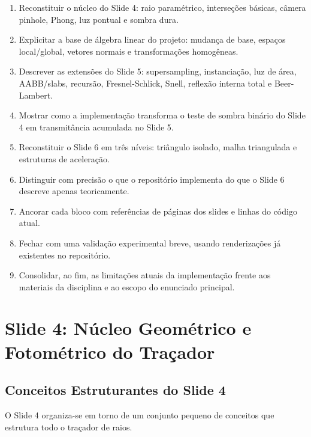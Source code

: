\documentclass[portuguese]{sbcreviews-2025}%
\begin{document}
\begin{enumerate}
    \item Reconstituir o núcleo do Slide 4: raio paramétrico, interseções básicas, câmera pinhole, Phong, luz pontual e sombra dura.
    \item Explicitar a base de álgebra linear do projeto: mudança de base, espaços local/global, vetores normais e transformações homogêneas.
    \item Descrever as extensões do Slide 5: supersampling, instanciação, luz de área, AABB/slabs, recursão, Fresnel-Schlick, Snell, reflexão interna total e Beer-Lambert.
    \item Mostrar como a implementação transforma o teste de sombra binário do Slide 4 em transmitância acumulada no Slide 5.
    \item Reconstituir o Slide 6 em três níveis: triângulo isolado, malha triangulada e estruturas de aceleração.
    \item Distinguir com precisão o que o repositório implementa do que o Slide 6 descreve apenas teoricamente.
    \item Ancorar cada bloco com referências de páginas dos slides e linhas do código atual.
    \item Fechar com uma validação experimental breve, usando renderizações já existentes no repositório.
    \item Consolidar, ao fim, as limitações atuais da implementação frente aos materiais da disciplina e ao escopo do enunciado principal.
\end{enumerate}

\section{Slide 4: Núcleo Geométrico e Fotométrico do Traçador}
\label{sec:slide4}

\subsection{Conceitos Estruturantes do Slide 4}
\label{sec:slide4-conceitos}

O Slide 4 organiza-se em torno de um conjunto pequeno de conceitos que estrutura todo o traçador de raios.
\end{document}
